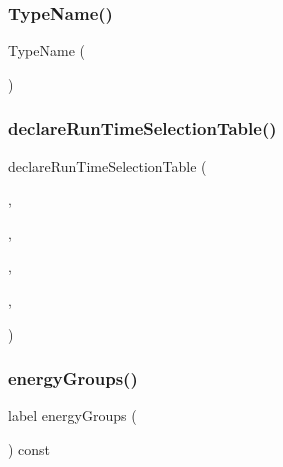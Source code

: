 \subsubsection{\texorpdfstring{Type\+Name()}{TypeName()}}
{\footnotesize\ttfamily Type\+Name (\begin{DoxyParamCaption}\item[{\char`\"{}X\+S\+Low\+Mem\char`\"{}}]{ }\end{DoxyParamCaption})}

\mbox{\label{classFoam_1_1XSLowMem_ab6ad4c644ede1abff3f4ddf6ad5313ef}} 
\subsubsection{\texorpdfstring{declare\+Run\+Time\+Selection\+Table()}{declareRunTimeSelectionTable()}}
{\footnotesize\ttfamily declare\+Run\+Time\+Selection\+Table (\begin{DoxyParamCaption}\item[{auto\+Ptr}]{,  }\item[{\hyperlink{classFoam_1_1XSLowMem}{X\+S\+Low\+Mem}}]{,  }\item[{dictionary}]{,  }\item[{(const fv\+Mesh \&\hyperlink{createMeshesPostProcess_8H_a8bb1e58291d2d2b653e024a4f4bffe38}{mesh})}]{,  }\item[{(\hyperlink{createMeshesPostProcess_8H_a8bb1e58291d2d2b653e024a4f4bffe38}{mesh})}]{ }\end{DoxyParamCaption})}

\mbox{\label{classFoam_1_1XSLowMem_a4ac79b302698620f0566eac803ba02d3}} 
\subsubsection{\texorpdfstring{energy\+Groups()}{energyGroups()}}
{\footnotesize\ttfamily label energy\+Groups (\begin{DoxyParamCaption}{ }\end{DoxyParamCaption}) const\hspace{0.3cm}{\ttfamily [inline]}}




